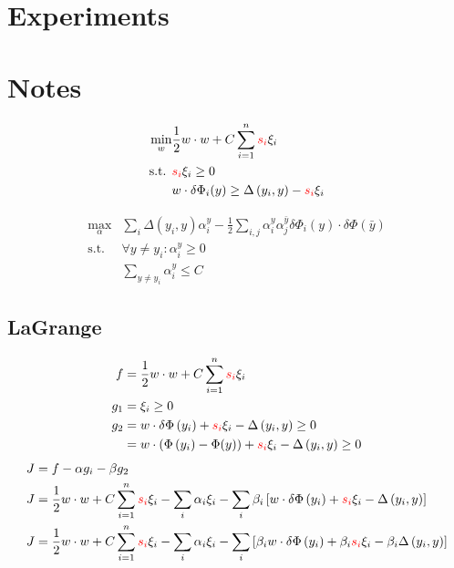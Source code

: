 \documentclass{IEEEtran}
\begin{document}
\section{Experiments}

\section{Notes}
\begin{align*}
    \min_w & \frac{1}{2} w \cdot w + C \sum_{i=1}^n \textcolor{red}{s_i} \xi_i \\
    \text{s.t. } & \textcolor{red}{s_i} \xi_i \ge 0 \\
    & w \cdot \delta \Phi_i(y) \ge \Delta\left(y_i, y\right) - \textcolor{red}{s_i} \xi_i
\end{align*}

\begin{align*}
    \max_\alpha & \sum_i \Delta\left(y_i, y\right) \alpha_i^y - \frac{1}{2} \sum_{i,j} \alpha_i^y
    \alpha_j^{\bar{y}} \delta \Phi_i(y) \cdot \delta \Phi(\bar{y}) \\
    \text{s.t. } & \forall y \ne y_i : \alpha_i^y \ge 0 \\
    & \sum_{y \ne y_i} \alpha_i^y \le C
\end{align*}

\newpage

\subsection{LaGrange}
\begin{align}
    f &= \frac{1}{2} w \cdot w + C \sum_{i=1}^n \textcolor{red}{s_i} \xi_i \\
    g_1 &= \xi_i \ge 0 \\
    g_2 &= w \cdot \delta \Phi\left(y_i\right) + \textcolor{red}{s_i} \xi_i - \Delta\left(y_i, y\right) \ge 0 \\
    &= w \cdot \left(\Phi\left(y_i\right) - \Phi(y)\right) + \textcolor{red}{s_i} \xi_i - \Delta\left(y_i, y\right) \ge 0 \nonumber
\end{align}
\begin{align}
    J &= f - \alpha g_i - \beta g_2 \\
    J &= \frac{1}{2} w \cdot w + C \sum_{i=1}^n \textcolor{red}{s_i} \xi_i -
        \sum_i \alpha_i \xi_i -
        \sum_i \beta_i \left[w \cdot \delta \Phi\left(y_i\right) + \textcolor{red}{s_i} \xi_i - \Delta\left(y_i, y\right)\right] \nonumber \\
    J &= \frac{1}{2} w \cdot w + C \sum_{i=1}^n \textcolor{red}{s_i} \xi_i -
        \sum_i \alpha_i \xi_i -
        \sum_i \left[ \beta_i w \cdot \delta \Phi\left(y_i\right) + \beta_i \textcolor{red}{s_i} \xi_i - \beta_i \Delta\left(y_i, y\right)\right] \nonumber \nonumber
\end{align}
\end{document}
